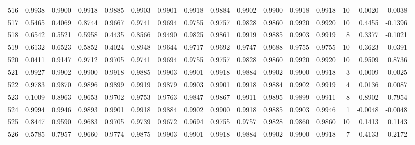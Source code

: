 \begin{tabular}{lrrrrrrrrrrrrrrr}
516 &      0.9938 &  0.9900 &  0.9918 &  0.9885 &  0.9903 &  0.9901 &  0.9918 &  0.9884 &  0.9902 &  0.9900 &   0.9918 &     0.9918 &     10 &                   -0.0020 &                    -0.0038 \\
517 &      0.5465 &  0.4069 &  0.8744 &  0.9667 &  0.9741 &  0.9694 &  0.9755 &  0.9757 &  0.9828 &  0.9860 &   0.9920 &     0.9920 &     10 &                    0.4455 &                    -0.1396 \\
518 &      0.6542 &  0.5521 &  0.5958 &  0.4435 &  0.8566 &  0.9490 &  0.9825 &  0.9861 &  0.9919 &  0.9885 &   0.9903 &     0.9919 &      8 &                    0.3377 &                    -0.1021 \\
519 &      0.6132 &  0.6523 &  0.5852 &  0.4024 &  0.8948 &  0.9644 &  0.9717 &  0.9692 &  0.9747 &  0.9688 &   0.9755 &     0.9755 &     10 &                    0.3623 &                     0.0391 \\
520 &      0.0411 &  0.9147 &  0.9712 &  0.9705 &  0.9741 &  0.9694 &  0.9755 &  0.9757 &  0.9828 &  0.9860 &   0.9920 &     0.9920 &     10 &                    0.9509 &                     0.8736 \\
521 &      0.9927 &  0.9902 &  0.9900 &  0.9918 &  0.9885 &  0.9903 &  0.9901 &  0.9918 &  0.9884 &  0.9902 &   0.9900 &     0.9918 &      3 &                   -0.0009 &                    -0.0025 \\
522 &      0.9783 &  0.9870 &  0.9896 &  0.9899 &  0.9919 &  0.9879 &  0.9903 &  0.9901 &  0.9918 &  0.9884 &   0.9902 &     0.9919 &      4 &                    0.0136 &                     0.0087 \\
523 &      0.1009 &  0.8963 &  0.9653 &  0.9702 &  0.9753 &  0.9763 &  0.9847 &  0.9867 &  0.9911 &  0.9895 &   0.9899 &     0.9911 &      8 &                    0.8902 &                     0.7954 \\
524 &      0.9994 &  0.9946 &  0.9893 &  0.9901 &  0.9918 &  0.9884 &  0.9902 &  0.9900 &  0.9918 &  0.9885 &   0.9903 &     0.9946 &      1 &                   -0.0048 &                    -0.0048 \\
525 &      0.8447 &  0.9590 &  0.9683 &  0.9705 &  0.9739 &  0.9672 &  0.9694 &  0.9755 &  0.9757 &  0.9828 &   0.9860 &     0.9860 &     10 &                    0.1413 &                     0.1143 \\
526 &      0.5785 &  0.7957 &  0.9660 &  0.9774 &  0.9875 &  0.9903 &  0.9901 &  0.9918 &  0.9884 &  0.9902 &   0.9900 &     0.9918 &      7 &                    0.4133 &                     0.2172 \\

\end{tabular}
